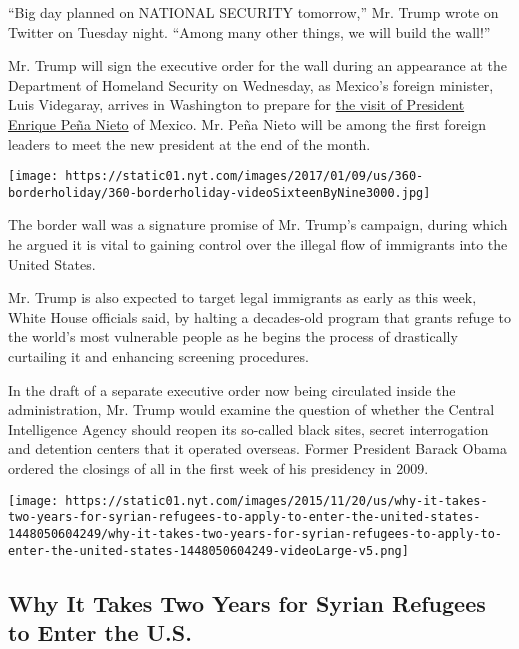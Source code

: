 ``Big day planned on NATIONAL SECURITY tomorrow,'' Mr. Trump wrote on
Twitter on Tuesday night. ``Among many other things, we will build the
wall!''

Mr. Trump will sign the executive order for the wall during an
appearance at the Department of Homeland Security on Wednesday, as
Mexico's foreign minister, Luis Videgaray, arrives in Washington to
prepare for
\href{https://www.nytimes.com/2017/01/23/world/americas/trump-pena-nieto-mexico-meeting.html}{the
visit of President Enrique Peña Nieto} of Mexico. Mr. Peña Nieto will be
among the first foreign leaders to meet the new president at the end of
the month.

\texttt{[image: https://static01.nyt.com/images/2017/01/09/us/360-borderholiday/360-borderholiday-videoSixteenByNine3000.jpg]}

The border wall was a signature promise of Mr. Trump's campaign, during
which he argued it is vital to gaining control over the illegal flow of
immigrants into the United States.

Mr. Trump is also expected to target legal immigrants as early as this
week, White House officials said, by halting a decades-old program that
grants refuge to the world's most vulnerable people as he begins the
process of drastically curtailing it and enhancing screening procedures.

In the draft of a separate executive order now being circulated inside
the administration, Mr. Trump would examine the question of whether the
Central Intelligence Agency should reopen its so-called black sites,
secret interrogation and detention centers that it operated overseas.
Former President Barack Obama ordered the closings of all in the first
week of his presidency in 2009.

\href{https://www.nytimes.com/interactive/2015/11/20/us/why-it-takes-two-years-for-syrian-refugees-to-apply-to-enter-the-united-states.html}{}

\texttt{[image: https://static01.nyt.com/images/2015/11/20/us/why-it-takes-two-years-for-syrian-refugees-to-apply-to-enter-the-united-states-1448050604249/why-it-takes-two-years-for-syrian-refugees-to-apply-to-enter-the-united-states-1448050604249-videoLarge-v5.png]}

\hypertarget{why-it-takes-two-years-for-syrian-refugees-to-enter-the-us}{%
\subsection{Why It Takes Two Years for Syrian Refugees to Enter the
U.S.}\label{why-it-takes-two-years-for-syrian-refugees-to-enter-the-us}}

